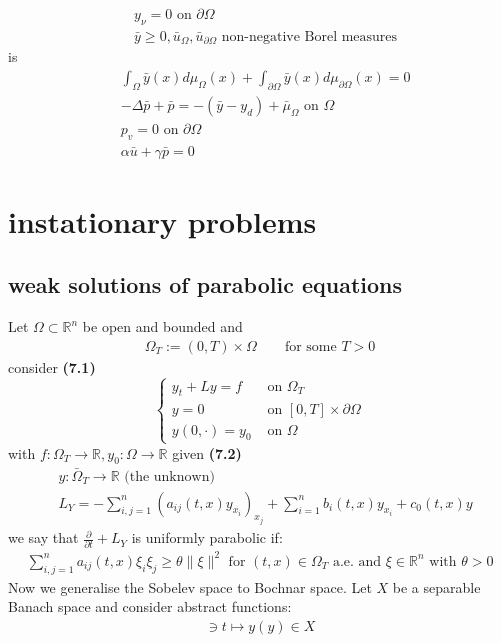 \begin{example}
\begin{align*}
	&y_\nu = 0 \text{ on } \partial \Omega\\
	&\bar{y} \ge 0, \bar{u}_\Omega, \bar{u}_{\partial\Omega} \text{ non-negative Borel measures}
\end{align*}
is
\begin{align*}
	&\int_\Omega \bar{y}(x) d\mu_{\Omega}(x) + \int_{\partial\Omega} \bar{y}(x) d\mu_{\partial\Omega}(x) = 0 \\
	&-\Delta \bar{p} + \bar{p} = -(\bar{y} - y_d) + \bar{\mu}_\Omega \text{ on } \Omega \\
	&p_v = 0 \text{ on } \partial \Omega\\
	&\alpha \bar{u} + \gamma \bar{p} = 0 
\end{align*}
\end{example}


\section{instationary problems}
\subsection{weak solutions of parabolic equations}
Let $\Omega \subset \mathbb{R}^n$ be open and bounded and 
\begin{align*}
	\Omega_T := (0, T) \times \Omega \qquad \text{for some } T > 0
\end{align*}
consider \textbf{(7.1)}
\begin{equation*}
\left\{
\begin{aligned}
	y_t + Ly = f &\text{ on } \Omega_T\\
	y= 0 &\text{ on } [0, T] \times \partial\Omega\\
	y(0, \cdot) = y_0 &\text{ on } \Omega
\end{aligned}
\right.
\end{equation*}
with $f : \Omega_T \rightarrow \mathbb{R}, y_0: \Omega \rightarrow \mathbb{R}$ given \textbf{(7.2)}
\begin{align*}
	&y :\bar{\Omega}_T \rightarrow \mathbb{R} \text{ (the unknown) }\\
	&L_Y = -\sum_{i, j = 1}^n (a_{ij}(t, x)y_{x_i})_{x_j} + 
	\sum_{i = 1}^n b_i(t, x) y_{x_i} + c_0(t, x) y
\end{align*}
we say that $\frac{\partial}{\partial t} + L_Y$ is uniformly parabolic if:
\begin{align*}
	\sum_{i,j = 1}^n a_{ij}(t, x) \xi_i \xi_j \geq \theta \|\xi\|^2
	\text{ for } (t, x) \in \Omega_T \text{ a.e. and } \xi \in \mathbb{R}^n \text{ with } \theta > 0 
\end{align*}
Now we generalise the Sobelev space to Bochnar space. Let $X$ be a separable Banach space and consider abstract functions:
\begin{align*}
	[0, T] \ni t  \mapsto y(y) \in X
\end{align*}

